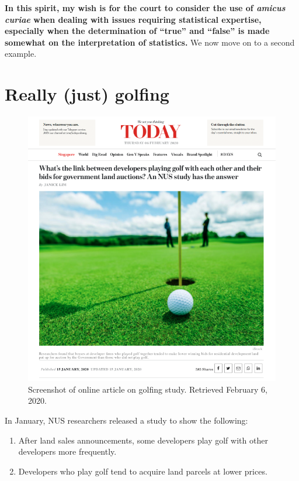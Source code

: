 \documentclass[
  openany]{book}
\providecommand{\tightlist}{%
  \setlength{\itemsep}{0pt}\setlength{\parskip}{0pt}}
\begin{document}
\textbf{In this spirit, my wish is for the court to consider the use of \emph{amicus curiae} when dealing with issues requiring statistical expertise, especially when the determination of ``true'' and ``false'' is made somewhat on the interpretation of statistics.} We now move on to a second example.

\hypertarget{golfing}{%
\section{Really (just) golfing}\label{golfing}}

\begin{figure}

{\centering \includegraphics[width=0.9\linewidth]{images/yousayisay/news2} 

}

\caption{Screenshot of online article on golfing study. Retrieved February 6, 2020.}\label{fig:today-golf}
\end{figure}

In January, NUS researchers released a study to show the following:

\begin{enumerate}
\def\labelenumi{\arabic{enumi}.}
\tightlist
\item
  After land sales announcements, some developers play golf with other developers more frequently.
\item
  Developers who play golf tend to acquire land parcels at lower prices.
\end{enumerate}
\end{document}
